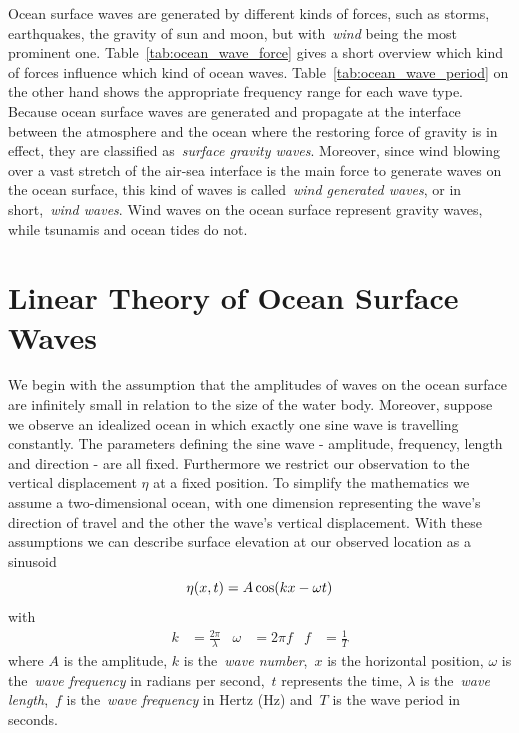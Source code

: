 Ocean surface waves are generated by different kinds of forces, such as storms, earthquakes,
the gravity of sun and moon, but with~\emph{wind} being the most prominent one. Table~\ref{tab:ocean_wave_force}
gives a short overview which kind of forces influence which kind of ocean waves. Table~\ref{tab:ocean_wave_period}
on the other hand shows the appropriate frequency range for each wave type.\\

Because ocean surface waves are generated and propagate at the interface between the atmosphere
and the ocean where the restoring force of gravity is in effect, they are classified as~\emph{surface gravity waves}.
Moreover, since wind blowing over a vast stretch of the air-sea interface is the main force to generate waves on
the ocean surface, this kind of waves is called~\emph{wind generated waves}, or in short,~\emph{wind waves}.
Wind waves on the ocean surface represent gravity waves, while tsunamis and ocean tides do not.


\section{Linear Theory of Ocean Surface Waves}
\label{sec:linear_theory_ocean_waves}
 \cite{book:kinsman2002wind}
We begin with the assumption that the amplitudes of waves on the ocean surface are infinitely
small in relation to the size of the water body. Moreover, suppose we observe an idealized ocean
in which exactly one sine wave is travelling constantly. The parameters defining the sine wave
- amplitude, frequency, length and direction - are all fixed. Furthermore we restrict our observation
to the vertical displacement $\eta$ at a fixed position. To simplify the mathematics we assume
a two-dimensional ocean, with one dimension representing the wave's direction of travel and the
 other the wave's vertical displacement. With these assumptions we can describe surface elevation
at our observed location as a sinusoid
%
\begin{equation}
\label{eq:sinusoid}
 \eta(x, t) = A\cos(kx - \omega t)\\
\end{equation}
with
\begin{align}
 k &= \frac{2\pi}{\lambda} & \omega &= 2\pi f & f &= \frac{1}{T}
\end{align}
%
where $A$ is the amplitude, $k$ is the~\emph{wave number},~$x$ is the horizontal position,
$\omega$ is the~\emph{wave frequency} in radians per second,~$t$ represents the time,
$\lambda$ is the~\emph{wave length},~$f$ is the~\emph{wave frequency} in Hertz (Hz) and~$T$
is the wave period in seconds.

